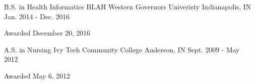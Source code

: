
\begin{cventries}

  \cventry
    {B.S. in Health Informatics BLAH} %
    {Western Governors Univeristy} %
    {Indianapolis, IN} %
    {Jan. 2014 - Dec. 2016} %
    {
      \begin{cvitems} %
        \item {Awarded December 20, 2016}
      \end{cvitems}
    }

  \cventry
    {A.S. in Nursing} %
    {Ivy Tech Community College} %
    {Anderson, IN} %
    {Sept. 2009 - May 2012} %
    {
      \begin{cvitems} %
      \item {Awarded May 6, 2012}
      \end{cvitems}
    }

\end{cventries}
